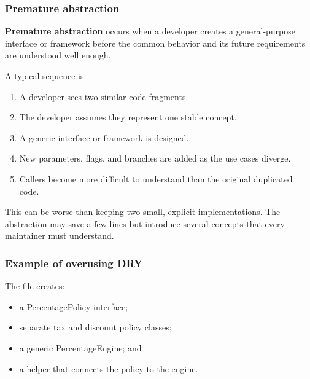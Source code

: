 \documentclass[12pt,a4paper]{article}
\begin{document}
\subsubsection{Premature abstraction}

\textbf{Premature abstraction} occurs when a developer creates a general-purpose interface or framework before the common behavior and its future requirements are understood well enough.

A typical sequence is:

\begin{enumerate}

\item A developer sees two similar code fragments.

\item The developer assumes they represent one stable concept.

\item A generic interface or framework is designed.

\item New parameters, flags, and branches are added as the use cases diverge.

\item Callers become more difficult to understand than the original duplicated code.

\end{enumerate}

This can be worse than keeping two small, explicit implementations. The abstraction may save a few lines but introduce several concepts that every maintainer must understand.

\subsubsection{Example of overusing DRY}

The file  creates:

\begin{itemize}

\item a PercentagePolicy interface;

\item separate tax and discount policy classes;

\item a generic PercentageEngine; and

\item a helper that connects the policy to the engine.

\end{itemize}
\end{document}
